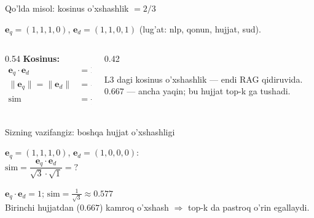 \documentclass[aspectratio=169,11pt]{beamer}
\begin{document}
\begin{frame}{Qo'lda misol: kosinus o'xshashlik $= 2/3$}
  \begin{tcolorbox}[defbox,title={So'rov va hujjat vektorlari}]
    \small $\mathbf{e}_q = (1,1,1,0)$, \; $\mathbf{e}_d = (1,1,0,1)$
    (lug'at: nlp, qonun, hujjat, sud).
  \end{tcolorbox}
  \vspace{0.2em}
  \begin{columns}[T]
    \begin{column}{0.54\textwidth}
      \textbf{Kosinus:}
      \begin{align*}
        \mathbf{e}_q \cdot \mathbf{e}_d &= 1+1+0+0 = 2\\
        \lVert\mathbf{e}_q\rVert = \lVert\mathbf{e}_d\rVert &= \sqrt{3}\\
        \mathrm{sim} &= \tfrac{2}{\sqrt{3}\cdot\sqrt{3}} = \tfrac{2}{3} \approx \mathbf{0.667}
      \end{align*}
    \end{column}
    \begin{column}{0.42\textwidth}
      \begin{tcolorbox}[okbox,top=2pt,bottom=2pt]
        \footnotesize
        L3 dagi kosinus o'xshashlik --- endi RAG qidiruvida. $0.667$ --- ancha
        yaqin; bu hujjat top-k ga tushadi.
      \end{tcolorbox}
    \end{column}
  \end{columns}
\end{frame}

\begin{frame}{Sizning vazifangiz: boshqa hujjat o'xshashligi}
  \begin{tcolorbox}[warnbox,title=Savol --- 60 soniya]
    \small
    $\mathbf{e}_q = (1,1,1,0)$, \; $\mathbf{e}_d = (1,0,0,0)$:\\[4pt]
    \textbf{\large $\mathrm{sim} = \dfrac{\mathbf{e}_q\cdot\mathbf{e}_d}
       {\sqrt{3}\cdot\sqrt{1}} = ?$}
  \end{tcolorbox}
  \pause
  \begin{tcolorbox}[okbox,title=Javob]
    \small
    $\mathbf{e}_q\cdot\mathbf{e}_d = 1$; \quad
    $\mathrm{sim} = \tfrac{1}{\sqrt{3}} \approx \mathbf{0.577}$\\[3pt]
    \footnotesize Birinchi hujjatdan ($0.667$) kamroq o'xshash $\Rightarrow$
    top-k da pastroq o'rin egallaydi.
  \end{tcolorbox}
\end{frame}
\end{document}
